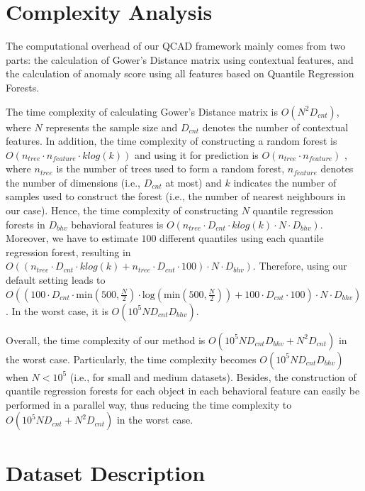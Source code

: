 \documentclass[pdflatex,sn-basic]{sn-jnl}%
\theoremstyle{thmstyleone}%
\theoremstyle{thmstyletwo}%
\theoremstyle{thmstylethree}%
\begin{document}
\begin{appendices}
\section{Complexity Analysis}\label{Appendix:Complexity}
The computational overhead of our QCAD framework mainly comes from two parts: the calculation of Gower's Distance matrix using contextual features, and the calculation of anomaly score using all features based on Quantile Regression Forests. 

The time complexity of calculating Gower's Distance matrix is $O(N^{2}D_{cnt})$, where $N$ represents the sample size and $D_{cnt}$ denotes the number of contextual features. In addition, the time complexity of constructing a random forest is $O( n_{tree}\cdot n_{feature} \cdot k log(k))$ and using it for prediction is $O( n_{tree}\cdot n_{feature})$ \citep{buczak2015survey}, where $n_{tree}$ is the number of trees used to form a random forest, $n_{feature}$ denotes the number of dimensions (i.e., $D_{cnt}$ at most) and $k$ indicates the number of samples used to construct the forest (i.e., the number of nearest neighbours in our case). Hence, the time complexity of constructing $N$ quantile regression forests in $D_{bhv}$ behavioral features is  $O( n_{tree}\cdot D_{cnt} \cdot k log(k) \cdot N \cdot D_{bhv} )$. 
Moreover, we have to estimate $100$ different quantiles using each quantile regression forest, resulting in $O( (n_{tree} \cdot D_{cnt} \cdot k log(k)+ n_{tree} \cdot D_{cnt} \cdot 100) \cdot N \cdot D_{bhv} )$. Therefore, using our default setting leads to $O( ( 100 \cdot D_{cnt} \cdot \mathrm{min}(500,\frac{N}{2})\cdot \mathrm{log}(\mathrm{min}(500,\frac{N}{2})) + 100 \cdot D_{cnt} \cdot 100) \cdot N \cdot D_{bhv})$. In the worst case, it is $O(10^{5}N D_{cnt}D_{bhv}).$

Overall, the time complexity of our method is $O(10^{5}N D_{cnt}D_{bhv}+N^{2}D_{cnt})$ in the worst case. Particularly, the time complexity becomes $O(10^{5}N D_{cnt}D_{bhv})$ when $N<10^{5}$ (i.e., for small and medium datasets). Besides, the construction of quantile regression forests for each object in each behavioral feature can easily be performed in a parallel way, thus reducing the time complexity to $O(10^{5}N D_{cnt}+N^{2}D_{cnt})$ in the worst case.

\section{Dataset Description}\label{Appendix:Data}


\end{appendices}
\end{document}
